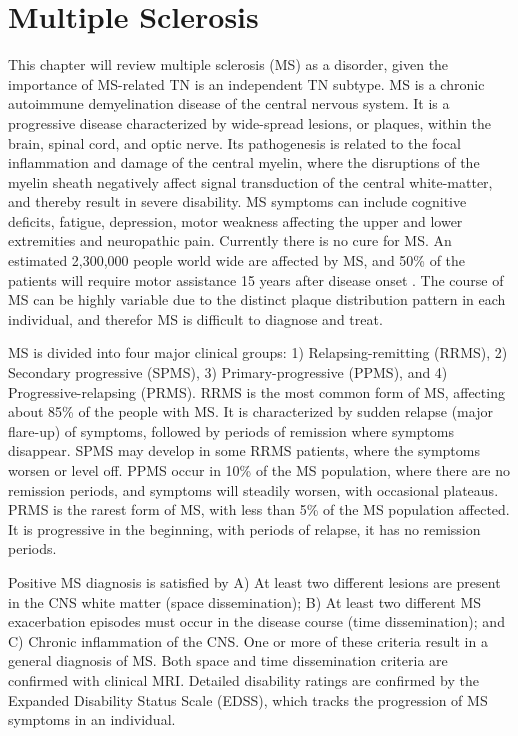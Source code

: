 \section{Multiple Sclerosis}
This chapter will review multiple sclerosis (MS) as a disorder, given the importance of MS-related TN is an independent TN subtype. MS is a chronic autoimmune demyelination disease of the central nervous system. It is a progressive disease characterized by wide-spread lesions, or plaques, within the brain, spinal cord, and optic nerve. Its pathogenesis is related to the focal inflammation and damage of the central myelin, where the disruptions of the myelin sheath negatively affect signal transduction of the central white-matter, and thereby result in severe disability. MS symptoms can include cognitive deficits, fatigue, depression, motor weakness affecting the upper and lower extremities and neuropathic pain. Currently there is no cure for MS. An estimated 2,300,000 people world wide are affected by MS, and 50\% of the patients will require motor assistance 15 years after disease onset \cite{Goldenberg2012}. The course of MS can be highly variable due to the distinct plaque distribution pattern in each individual, and therefor MS is difficult to diagnose and treat.

MS is divided into four major clinical groups: 1) Relapsing-remitting (RRMS), 2) Secondary progressive (SPMS), 3) Primary-progressive (PPMS), and 4) Progressive-relapsing (PRMS). RRMS is the most common form of MS, affecting about 85\% of the people with MS. It is characterized by sudden relapse (major flare-up) of symptoms, followed by periods of remission where symptoms disappear. SPMS may develop in some RRMS patients, where the symptoms worsen or level off. PPMS occur in 10\% of the MS population, where there are no remission periods, and symptoms will steadily worsen, with occasional plateaus. PRMS is the rarest form of MS, with less than 5\% of the MS population affected. It is progressive in the beginning, with periods of relapse, it has no remission periods. 

Positive MS diagnosis is satisfied by A) At least two different lesions are present in the CNS white matter (space dissemination); B) At least two different MS exacerbation episodes must occur in the disease course (time dissemination); and C) Chronic inflammation of the CNS. One or more of these criteria result in a general diagnosis of MS. Both space and time dissemination criteria are confirmed with clinical MRI. Detailed disability ratings are confirmed by the Expanded Disability Status Scale (EDSS)\cite{Kurtzke1983}, which tracks the progression of MS symptoms in an individual.


